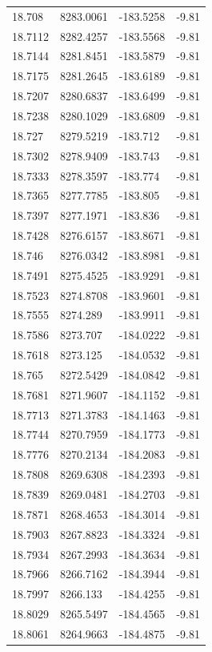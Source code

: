 \begin{table}[H]
\begin{tabular}{llll}
18.708 & 8283.0061 & -183.5258 & -9.81 \\
18.7112 & 8282.4257 & -183.5568 & -9.81 \\
18.7144 & 8281.8451 & -183.5879 & -9.81 \\
18.7175 & 8281.2645 & -183.6189 & -9.81 \\
18.7207 & 8280.6837 & -183.6499 & -9.81 \\
18.7238 & 8280.1029 & -183.6809 & -9.81 \\
18.727 & 8279.5219 & -183.712 & -9.81 \\
18.7302 & 8278.9409 & -183.743 & -9.81 \\
18.7333 & 8278.3597 & -183.774 & -9.81 \\
18.7365 & 8277.7785 & -183.805 & -9.81 \\
18.7397 & 8277.1971 & -183.836 & -9.81 \\
18.7428 & 8276.6157 & -183.8671 & -9.81 \\
18.746 & 8276.0342 & -183.8981 & -9.81 \\
18.7491 & 8275.4525 & -183.9291 & -9.81 \\
18.7523 & 8274.8708 & -183.9601 & -9.81 \\
18.7555 & 8274.289 & -183.9911 & -9.81 \\
18.7586 & 8273.707 & -184.0222 & -9.81 \\
18.7618 & 8273.125 & -184.0532 & -9.81 \\
18.765 & 8272.5429 & -184.0842 & -9.81 \\
18.7681 & 8271.9607 & -184.1152 & -9.81 \\
18.7713 & 8271.3783 & -184.1463 & -9.81 \\
18.7744 & 8270.7959 & -184.1773 & -9.81 \\
18.7776 & 8270.2134 & -184.2083 & -9.81 \\
18.7808 & 8269.6308 & -184.2393 & -9.81 \\
18.7839 & 8269.0481 & -184.2703 & -9.81 \\
18.7871 & 8268.4653 & -184.3014 & -9.81 \\
18.7903 & 8267.8823 & -184.3324 & -9.81 \\
18.7934 & 8267.2993 & -184.3634 & -9.81 \\
18.7966 & 8266.7162 & -184.3944 & -9.81 \\
18.7997 & 8266.133 & -184.4255 & -9.81 \\
18.8029 & 8265.5497 & -184.4565 & -9.81 \\
18.8061 & 8264.9663 & -184.4875 & -9.81 \\

\end{tabular}
\end{table}
